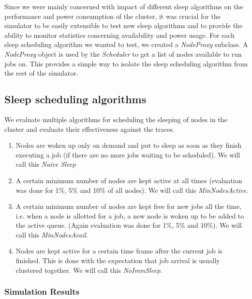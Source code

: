 Since we were mainly concerned with impact of different sleep algorithms on the performance and power consumption of the cluster, it was crucial for the simulator to be easily extensible to test new sleep algorithms and to provide the ability to monitor statistics concerning availability and power usage. For each sleep scheduling algorithm we wanted to test, we created a \emph{NodeProxy} subclass. A \emph{NodeProxy} object is used by the \emph{Scheduler} to get a list of nodes available to run jobs on. This provides a simple way to isolate the sleep scheduling algorithm from the rest of the simulator. %


\subsection{Sleep scheduling algorithms} %
\label{ssub:overhead_induced_by_cc}
We evaluate multiple algorithms for scheduling the sleeping of nodes in the cluster and evaluate their effectiveness against the traces. 
\begin{enumerate}
    \item Nodes are woken up only on demand and put to sleep as soon as they finish executing a job (if there are no more jobs waiting to be scheduled). We will call this {\em Naive Sleep}
    \item A certain minimum number of nodes are kept active at all times (evaluation was done for 1\%, 5\% and 10\% of all nodes). We will call this {\em MinNodesActive}.
    \item A certain minimum number of nodes are kept free for new jobs all the time, i.e. when a node is allotted for a job, a new node is woken up to be added to the active queue. (Again evaluation was done for 1\%, 5\% and 10\%). We will call this {\em MinNodesAvail}.
    \item Nodes are kept active for a certain time frame after the current job is finished. This is done with the expectation that job arrival is usually clustered together. We will call this {\em NoImmSleep}.
\end{enumerate}


\subsubsection{Simulation Results} %
\label{ssub:simulation_results}

